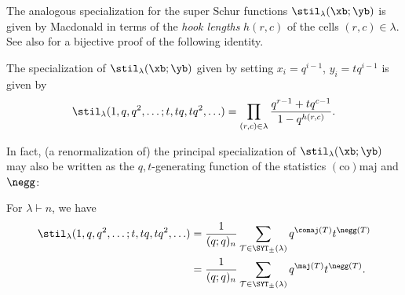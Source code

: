 The analogous specialization for the super Schur functions $\stil_\lambda(\xb;\yb)$ is given by Macdonald in terms of the \emph{hook lengths} $h(r,c)$ of the cells $(r,c) \in \lambda$. See also \cite{Kratt} for a bijective proof of the following identity.
\begin{thm}\label{qt-hook}
   The specialization of $\stil_\lambda(\xb;\yb)$ given by setting $x_i = q^{i-1}$, $y_i = tq^{i-1}$ is given by
   \[
   \stil_\lambda(1,q,q^2,\ldots;t,tq,tq^2,\ldots) = \prod_{(r,c) \in \lambda} \frac{q^{r-1} + tq^{c-1}}{1 - q^{h(r,c)}}.
   \]
\end{thm}
In fact, (a renormalization of) the principal specialization of $\stil_\lambda(\xb;\yb)$ may also be written as the $q,t$-generating function of the statistics $\mathrm{(co)maj}$ and $\negg$:
\begin{thm}\label{thm:s-ps}
For $\lambda \vdash n$, we have
\begin{align*}
 \stil_\lambda(1,q,q^2,\ldots;t,tq,tq^2,\ldots)
   &= \frac{1}{(q;q)_n} \sum_{\mathcal{T} \in \SYT_\pm(\lambda)} q^{\comaj(T)} t^{\negg(T)} \\
   &= \frac{1}{(q;q)_n} \sum_{\mathcal{T} \in \SYT_\pm(\lambda)} q^{\maj(T)} t^{\negg(T)}.
\end{align*}
\end{thm}
